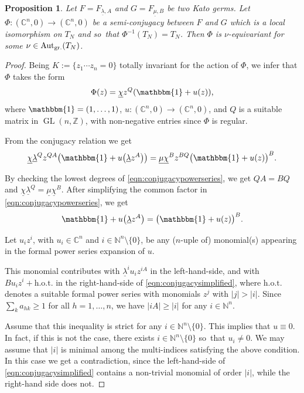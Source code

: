 \documentclass[JEP,XML,SOM,Unicode,NoFloatCountersInSection]{cedram}
\newtheorem{proposition}[theorem]{Proposition}
\theoremstyle{definition}
\let\la\lambda
\let\sminus\setminus
\let\un\underline
\newcommand{\CC}{\mathbb{C}}
\newcommand{\NN}{\mathbb{N}}
\newcommand{\ZZ}{\mathbb{Z}}
\newcommand{\one}{\mathbbm{1}}
\DeclareMathOperator{\Aut}{Aut}
\DeclareMathOperator{\GL}{GL}
\newcommand{\abs}[1]{\vert #1\vert}
\begin{document}
\begin{proposition}\label{prop:equivariantiso}
Let $F=F_{\un\la,A}$ and $G=F_{\un\mu,B}$ be two Kato germs. Let $\Phi:(\CC^n,0) \to (\CC^n,0)$ be a semi-conjugacy between $F$ and $G$ which is a local isomorphism on $T_N$ and so~that $\Phi^{-1}(T_N) = T_N$. Then $\Phi$ is $\nu$-equivariant for some $\nu\in\Aut_{\textup{gr.}}(T_N)$.
\end{proposition}
\begin{proof}
Being $K:=\{z_1 \cdots z_n=0\}$ totally invariant for the action of $\Phi$, we infer that $\Phi$ takes the form
\[
\Phi(z)=\un{\chi} z^{Q}(\one + u(z))\text,
\]
where $\one=(1, \ldots, 1)$, $u:(\CC^n,0)\to (\CC^n,0)$, and $Q$ is a suitable matrix in $\GL(n,\ZZ)$, with non-negative entries since $\Phi$ is regular.

From the conjugacy relation we get
\begin{equation}\label{eqn:conjugacypowerseries}
\un{\chi} \un{\lambda}^Q z^{QA} \big(\one+u\big(\un{\lambda} z^A\big)\big) =
\un{\mu} \un{\chi}^B z^{BQ} \big(\one+u(z)\big)^B\text.
\end{equation}

By checking the lowest degrees of \eqref{eqn:conjugacypowerseries}, we get $QA=BQ$ and $\un{\chi} \un{\lambda}^Q=\un{\mu}\un{\chi}^B$.
After simplifying the common factor in \eqref{eqn:conjugacypowerseries}, we get
\begin{equation}\label{eqn:conjugacysimplified}
\one+u\big(\un{\lambda} z^A\big) =
\big(\one+u(z)\big)^B\text.
\end{equation}

Let $u_i z^i$, with $u_i \in \CC^n$ and $i \in \NN^n \sminus \{0\}$, be any ($n$-uple of) monomial(s) appearing in the formal power series expansion of $u$.

This monomial contributes with $\un{\lambda}^i u_i z^{iA}$ in the left-hand-side, and with $B u_i z^{i}+\textrm{h.o.t.}$ in the right-hand-side of \eqref{eqn:conjugacysimplified}, where $\textrm{h.o.t.}$ denotes a suitable formal power series with monomials $z^j$ with $\abs{j}> \abs{i}$. Since $\sum_{k} a_{hk} \geq 1$ for all $h=1, \ldots, n$, we have $\abs{iA} \geq \abs{i}$ for any $i \in \NN^n$.

Assume that this inequality is strict for any $i \in \NN^n \sminus \{0\}$. This implies that $u\equiv 0$.
In fact, if this is not the case, there exists $i \in \NN^n \sminus \{0\}$ so~that $u_i \neq 0$. We may assume that $\abs{i}$ is minimal among the multi-indices satisfying the above condition.
In this case we get a contradiction, since the left-hand-side of \eqref{eqn:conjugacysimplified} contains a non-trivial monomial of order $\abs{i}$, while the right-hand side does not.


\end{proof}
\end{document}
